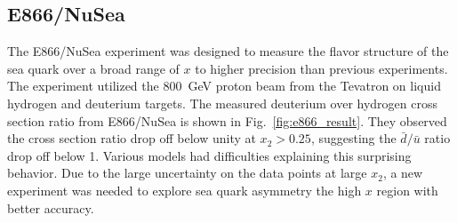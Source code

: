 \subsection{E866/NuSea}
\label{sec:E866}
The E866/NuSea experiment was designed to measure the flavor structure of the sea 
quark over a broad range of $x$ to higher precision than previous experiments. The 
experiment utilized the \SI{800}{\GeV} proton beam from the Tevatron on liquid 
hydrogen and deuterium targets. The measured deuterium over hydrogen cross section 
ratio from E866/NuSea is shown in Fig.\ \ref{fig:e866_result}. They observed the
cross section ratio drop off below unity at $x_2>0.25$, suggesting the $\bar{d}/\bar{u}$ 
ratio drop off below 1. Various models had difficulties explaining this surprising 
behavior. Due to the large uncertainty on the data points at large $x_2$, a new 
experiment was needed to explore sea quark asymmetry the high $x$ region with better 
accuracy.
